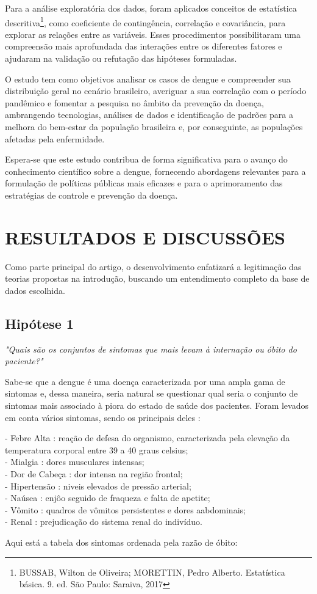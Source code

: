 \documentclass[a4paper, 12pt, twoside]{article}
\begin{document}
Para a análise exploratória dos dados, foram aplicados conceitos de estatística descritiva\footnote{BUSSAB, Wilton de Oliveira; MORETTIN, Pedro Alberto. Estatística básica. 9. ed. São Paulo: Saraiva, 2017}, como coeficiente de contingência, correlação e covariância, para explorar as relações entre as variáveis. Esses procedimentos possibilitaram uma compreensão mais aprofundada das interações entre os diferentes fatores e ajudaram na validação ou refutação das hipóteses formuladas.

O estudo tem como objetivos analisar os casos de dengue e compreender sua distribuição geral no cenário brasileiro, averiguar a sua correlação com o período pandêmico e fomentar a pesquisa no âmbito da prevenção da doença, ambrangendo tecnologias, análises de dados e identificação de padrões para a melhora do bem-estar da população brasileira e, por conseguinte, as populações afetadas pela enfermidade.

Espera-se que este estudo contribua de forma significativa para o avanço do conhecimento científico sobre a dengue, fornecendo abordagens relevantes para a formulação de políticas públicas mais eficazes e para o aprimoramento das estratégias de controle e prevenção da doença.
\\
\section{RESULTADOS E DISCUSSÕES}

Como parte principal do artigo, o desenvolvimento enfatizará a legitimação das teorias propostas na introdução, buscando um entendimento completo da base de dados escolhida.


\subsection{Hipótese 1}
\emph{"Quais são os conjuntos de sintomas que mais levam à internação ou óbito do paciente?"}

Sabe-se que a dengue é uma doença caracterizada por uma ampla gama de sintomas e, dessa maneira, seria natural se questionar qual seria o conjunto de sintomas mais associado à piora do estado de saúde dos pacientes.
Foram levados em conta vários sintomas, sendo os principais deles :
\begin{itemize}
    - Febre Alta : reação de defesa do organismo, caracterizada pela elevação da temperatura corporal entre 39 a 40 graus celsius;\\
    - Mialgia : dores musculares intensas; \\
    - Dor de Cabeça : dor intensa na região frontal;\\
    - Hipertensão : niveis elevados de pressão arterial;\\ 
    - Naúsea : enjôo seguido de fraqueza e falta de apetite;\\
    - Vômito : quadros de vômitos persistentes e dores aabdominais;\\
    - Renal : prejudicação do sistema renal do indivíduo.\\
\end{itemize} 
Aqui está a tabela dos sintomas ordenada pela razão de óbito:
\end{document}
